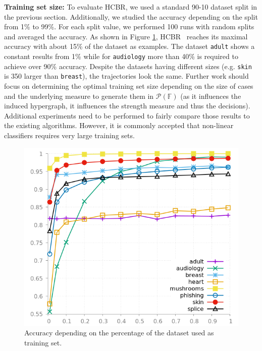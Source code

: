\documentclass[sigconf,edbt]{acmart-edbt-workshops}
\def\HCBR{{\sc HCBR}}
\begin{document}
\noindent
{\bf Training set size:} To evaluate \HCBR, we used a standard 90-10 dataset split in the previous section. Additionally, we studied the accuracy depending on the split from 1\% to 99\%. For each split value, we performed 100 runs with random splits and averaged the accuracy. As shown in Figure \ref{fig:accuracy}, \HCBR~ reaches its maximal accuracy with about 15\% of the dataset as examples. The dataset \texttt{adult} shows a constant results from 1\% while for \texttt{audiology} more than 40\% is required to achieve over 90\% accuracy. Despite the datasets having different sizes (e.g. \texttt{skin} is 350 larger than \texttt{breast}), the trajectories look the same. Further work should focus on determining the optimal training set size depending on the size of cases and the underlying measure to generate them in $\mathcal P({\mathbb F})$ (as it influences the induced hypergraph, it influences the strength measure and thus the decisions). Additional experiments need to be performed to fairly compare those results to the existing algorithms. However, it is commonly accepted that non-linear classifiers requires very large training sets.\\
\begin{figure}[!h]
\centering
\includegraphics[scale=0.35]{img/accuracy_by_examples.png}
\caption{Accuracy depending on the percentage of the dataset used as training set.}
\label{fig:accuracy}
\end{figure}
\end{document}
